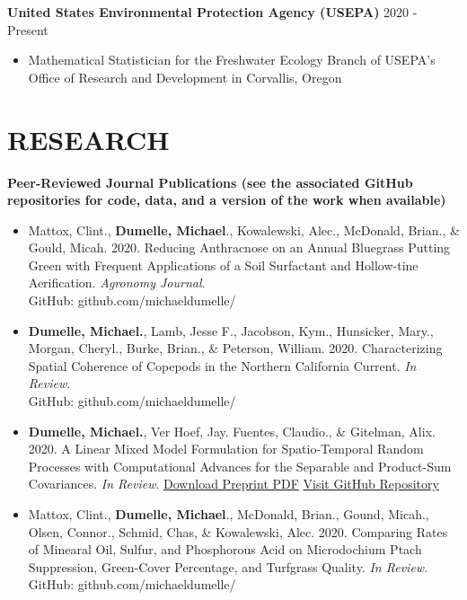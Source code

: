 \documentclass[line, margin, 10pt]{res}\usepackage[]{graphicx}\usepackage[]{color}
\begin{document}
\begin{resume}
\textbf{United States Environmental Protection Agency (USEPA)} \hfill 2020 - Present
\begin{itemize}
	\item Mathematical Statistician for the Freshwater Ecology Branch of USEPA's Office of Research and Development in Corvallis, Oregon
\end{itemize}

\section{RESEARCH}

\textbf{Peer-Reviewed Journal Publications (see the associated GitHub repositories for code, data, and a version of the work when available)}

\begin{itemize}
	
\item Mattox, Clint., \textbf{Dumelle, Michael}., Kowalewski, Alec., McDonald, Brian., \& Gould, Micah. 2020. Reducing Anthracnose on an Annual Bluegrass Putting Green with Frequent Applications of a Soil Surfactant and Hollow-tine Aerification. \emph{Agronomy Journal}. \\
GitHub: github.com/michaeldumelle/

\item \textbf{Dumelle, Michael.}, Lamb, Jesse F., Jacobson, Kym., Hunsicker, Mary., Morgan, Cheryl., Burke, Brian., \& Peterson, William. 2020. Characterizing Spatial Coherence of Copepods in the Northern California Current. \emph{In Review}. \\
 GitHub: github.com/michaeldumelle/

\item \textbf{Dumelle, Michael.}, Ver Hoef, Jay. Fuentes, Claudio., \& Gitelman, Alix. 2020. A Linear Mixed Model Formulation for Spatio-Temporal Random Processes with Computational Advances for the Separable and Product-Sum Covariances.  \emph{In Review}. 
\href{run:C:/Users/mdumelle/Documents/professional_development/website/michaeldumelle.github.io/files/research/journal_articles/DumelleEtAl2020STLMM.pdf}{Download Preprint PDF} \href{https://github.com/michaeldumelle/aLMMFWfSTRPwCAftSEPaPSc}{Visit GitHub Repository} 

\item Mattox, Clint., \textbf{Dumelle, Michael}., McDonald, Brian., Gound, Micah., Olsen, Connor., Schmid, Chas, \& Kowalewski, Alec. 2020. Comparing Rates of Minearal Oil, Sulfur, and Phosphorous Acid on Microdochium Ptach Suppression, Green-Cover Percentage, and Turfgrass Quality. \emph{In Review}. \\
GitHub: github.com/michaeldumelle/


\end{itemize}
\end{resume}
\end{document}
